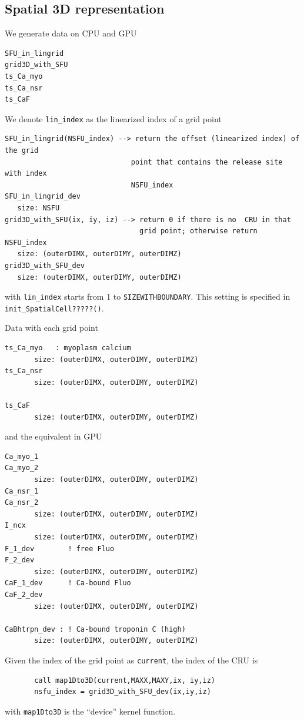 \subsection{Spatial 3D representation}
\label{sec:spatial-3Ddata}

We generate data on CPU and GPU
\begin{verbatim}
SFU_in_lingrid
grid3D_with_SFU
ts_Ca_myo
ts_Ca_nsr
ts_CaF
\end{verbatim}

We denote \verb!lin_index! as the linearized index of a grid point
\begin{verbatim}
SFU_in_lingrid(NSFU_index) --> return the offset (linearized index) of the grid
                              point that contains the release site with index
                              NSFU_index
SFU_in_lingrid_dev
   size: NSFU
grid3D_with_SFU(ix, iy, iz) --> return 0 if there is no  CRU in that
                                grid point; otherwise return NSFU_index
   size: (outerDIMX, outerDIMY, outerDIMZ)
grid3D_with_SFU_dev
   size: (outerDIMX, outerDIMY, outerDIMZ)

\end{verbatim}
with \verb!lin_index! starts from 1 to
\verb!SIZEWITHBOUNDARY!. This setting is specified in
\verb!init_SpatialCell?????()!.

Data with each grid point
\begin{verbatim}
ts_Ca_myo   : myoplasm calcium
       size: (outerDIMX, outerDIMY, outerDIMZ)
ts_Ca_nsr
       size: (outerDIMX, outerDIMY, outerDIMZ)

ts_CaF
       size: (outerDIMX, outerDIMY, outerDIMZ)
\end{verbatim}
and the equivalent in GPU
\begin{verbatim}
Ca_myo_1
Ca_myo_2
       size: (outerDIMX, outerDIMY, outerDIMZ)
Ca_nsr_1
Ca_nsr_2
       size: (outerDIMX, outerDIMY, outerDIMZ)
I_ncx
       size: (outerDIMX, outerDIMY, outerDIMZ)
F_1_dev        ! free Fluo
F_2_dev
       size: (outerDIMX, outerDIMY, outerDIMZ)
CaF_1_dev      ! Ca-bound Fluo
CaF_2_dev
       size: (outerDIMX, outerDIMY, outerDIMZ)

CaBhtrpn_dev : ! Ca-bound troponin C (high)
       size: (outerDIMX, outerDIMY, outerDIMZ)
\end{verbatim}

Given the index of the grid point as \verb!current!, the index of the CRU 
is 
\begin{verbatim}
       call map1Dto3D(current,MAXX,MAXY,ix, iy,iz)
       nsfu_index = grid3D_with_SFU_dev(ix,iy,iz)
\end{verbatim}
with \verb!map1Dto3D! is the ``device'' kernel function.

